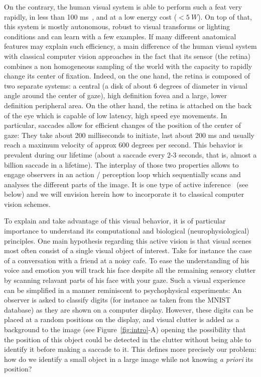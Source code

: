 On the contrary, the human visual system is able to perform such a feat very rapidly, in less than 100 ms~\citep{Kirchner06}, and at a low energy cost ($<5~W$). On top of that, this system is mostly autonomous, robust to visual transforms or lighting conditions and can learn with a few examples. If many different anatomical features may explain such efficiency, a main difference of the human visual system with classical computer vision approaches in the fact that its sensor (the retina) combines a non homogeneous sampling of the world with the capacity to rapidly change its center of fixation. Indeed, on the one hand, the retina is composed of two separate systems: a central (a disk of about 6 degrees of diameter in visual angle around the center of gaze), high definition fovea and a large, lower definition peripheral area. On the other hand, the retina is attached on the back of the eye which is capable of low latency, high speed eye movements. In particular, saccades allow for efficient changes of the position of the center of gaze: They take about 200 milliseconds to initiate, last about 200 ms and usually reach a maximum velocity of approx 600 degrees per second. This behavior is prevalent during our lifetime (about a saccade every 2-3 seconds, that is, almost a billion saccade in a lifetime). The interplay of those two properties allows to engage observers in an action / perception loop which sequentially scans and analyses the different parts of the image. It is one type of active inference~\citep{Friston12} (see below) and we will envision herein how to incorporate it to classical computer vision schemes.

To explain and take advantage of this visual behavior, it is of particular importance to understand its computational and biological (neurophysiological) principles. One main hypothesis regarding this active vision is that visual scenes most often consist of a single visual object of interest. Take for instance the case of a conversation with a friend at a noisy cafe. To ease the understanding of his voice and emotion you will track his face despite all the remaining sensory clutter by scanning relavant parts of his face with your gaze. Such a visual experience can be simplified in a manner reminiscent to psychophysical experiments: An observer is asked to classify digits (for instance as taken from the MNIST database) as they are shown on a computer display. However, these digits can be placed at a random positions on the display, and visual clutter is added as a background to the image (see Figure~\ref{fig:intro}-A) opening the possibility that the position of this object could be detected in the clutter without being able to identify it before making a saccade to it. This defines more precisely our problem: how do we identify a small object in a large image while not knowing \emph{a priori} its position?

